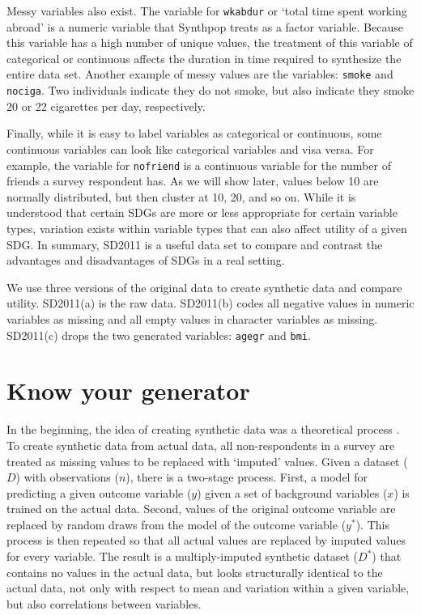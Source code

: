 \documentclass[runningheads]{llncs}
\begin{document}
Messy variables also exist.  The variable for \texttt{wkabdur} or `total time spent working abroad' is a numeric variable that Synthpop treats as a factor variable.  Because this variable has a high number of unique values, the treatment of this variable of categorical or continuous affects the duration in time required to synthesize the entire data set.  Another example of messy values are the variables: \texttt{smoke} and \texttt{nociga}.  Two individuals indicate they do not smoke, but also indicate they smoke 20 or 22 cigarettes per day, respectively.  

Finally, while it is easy to label variables as categorical or continuous, some continuous variables can look like categorical variables and visa versa.  For example, the variable for \texttt{nofriend} is a continuous variable for the number of friends a survey respondent has.  As we will show later, values below 10 are normally distributed, but then cluster at 10, 20, and so on.  While it is understood that certain SDGs are more or less appropriate for certain variable types, variation exists within variable types that can also affect utility of a given SDG.  In summary, SD2011 is a useful data set to compare and contrast the advantages and disadvantages of SDGs in a real setting.

We use three versions of the original data to create synthetic data and compare utility.  SD2011(a) is the raw data.  SD2011(b) codes all negative values in numeric variables as missing and all empty values in character variables as missing.  SD2011(c) drops the two generated variables: \texttt{agegr} and \texttt{bmi}.

\section{Know your generator}\label{sec:know_your_generator}

In the beginning, the idea of creating synthetic data was a theoretical process \cite{rubin1993statistical}.  To create synthetic data from actual data, all non-respondents in a survey are treated as missing values to be replaced with `imputed' values.  Given a dataset ($D$) with observations ($n$), there is a two-stage process.  First, a model for predicting a given outcome variable ($y$) given a set of background variables ($x$) is trained on the actual data.  Second, values of the original outcome variable are replaced by random draws from the model of the outcome variable ($y^*$).  This process is then repeated so that all actual values are replaced by imputed values for every variable.  The result is a multiply-imputed synthetic dataset ($D^*$) that contains no values in the actual data, but looks structurally identical to the actual data, not only with respect to mean and variation within a given variable, but also correlations between variables.  
\end{document}
